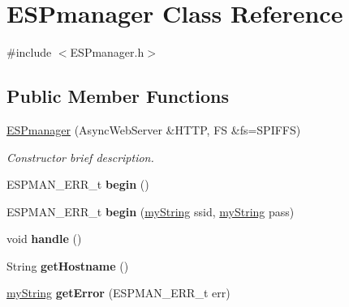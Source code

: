 \hypertarget{class_e_s_pmanager}{}\section{E\+S\+Pmanager Class Reference}
\label{class_e_s_pmanager}


{\ttfamily \#include $<$E\+S\+Pmanager.\+h$>$}

\subsection*{Public Member Functions}
\begin{DoxyCompactItemize}
\item 
\hyperlink{class_e_s_pmanager_ade34dcdb30c7577b56f46b03c38b83d8}{E\+S\+Pmanager} (Async\+Web\+Server \&H\+T\+TP, FS \&fs=S\+P\+I\+F\+FS)
\begin{DoxyCompactList}\small\item\em Constructor brief description. \end{DoxyCompactList}\item 
\mbox{\label{class_e_s_pmanager_a3ffeee3a4596d0416b4294987e94cd54}} 
E\+S\+P\+M\+A\+N\+\_\+\+E\+R\+R\+\_\+t {\bfseries begin} ()
\item 
\mbox{\label{class_e_s_pmanager_a18e1632178c113906997626820767f1d}} 
E\+S\+P\+M\+A\+N\+\_\+\+E\+R\+R\+\_\+t {\bfseries begin} (\hyperlink{class_e_s_p_m_a_n_1_1my_string}{my\+String} ssid, \hyperlink{class_e_s_p_m_a_n_1_1my_string}{my\+String} pass)
\item 
\mbox{\label{class_e_s_pmanager_abc765bc38931480a69aa722703116568}} 
void {\bfseries handle} ()
\item 
\mbox{\label{class_e_s_pmanager_a2ac01b9cca5905187732d6c6eeee433c}} 
String {\bfseries get\+Hostname} ()
\item 
\mbox{\label{class_e_s_pmanager_a11531fbfd8fc09fad93435f8a99b5780}} 
\hyperlink{class_e_s_p_m_a_n_1_1my_string}{my\+String} {\bfseries get\+Error} (E\+S\+P\+M\+A\+N\+\_\+\+E\+R\+R\+\_\+t err)
\item 
\mbox{\label{class_e_s_pmanager_a7fe42a45697d67434a21e4fbf2201572}} 

\end{DoxyCompactItemize}
